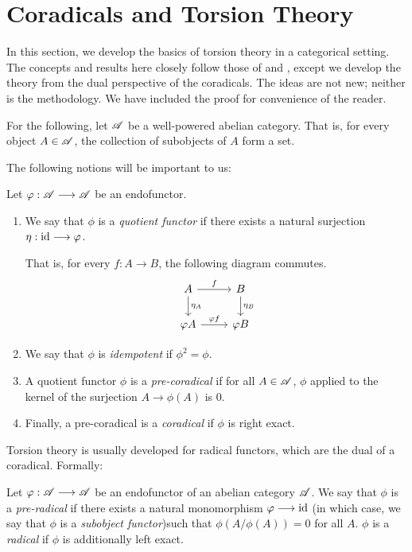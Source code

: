 \newpage
\section{Coradicals and Torsion Theory}\label{sect_torsion_theory}

In this section, we develop the basics of torsion theory in a 
categorical setting. The concepts and results here closely follow
those of \cite{BJV} and \cite{DTor}, except we develop the theory
from the dual perspective of the coradicals. The ideas are not new;
neither is the methodology. We have included the proof for 
convenience of the reader.

For the following, let $\mathscr{A}$ be a well-powered abelian category.
That is, for every object $A \in \mathscr{A}$, the collection of 
subobjects of $A$ form a set.

The following notions will be important to us:

\begin{defn}\label{def_coradical}
Let $\varphi: \mathscr{A} \longrightarrow \mathscr{A}$ be an endofunctor. 
\begin{enumerate}
\item We say that $\phi$ is a \emph{quotient functor} if there 
exists a natural surjection $\eta: \mathrm{id} \longrightarrow \varphi$. 

That is, for every $f: A \to B$, the following diagram commutes.
\[
\begin{tikzcd}
A \arrow{r}{f} \arrow{d}{\eta_A} &
B \arrow{d}{\eta_B} \\
\phi A \arrow{r}{\phi f} 
&\phi B
\end{tikzcd}
\]

\item We say that $\phi$ is \emph{idempotent} if $\phi^2 = \phi$.

\item A quotient functor $\phi$ is a \emph{pre-coradical} if for all
$A \in \mathscr{A}$, $\phi$ applied to the kernel of the surjection 
$A \to \phi(A)$ is $0$.

\item Finally, a pre-coradical is a \emph{coradical} if $\phi$ is
right exact.
\end{enumerate}
\end{defn}

Torsion theory is usually developed for radical functors, which 
are the dual of a coradical. Formally:

\begin{defn}\label{def_radical}
Let $\varphi: \mathscr{A} \longrightarrow \mathscr{A}$ be an endofunctor of an abelian 
category $\mathscr{A}$. We say that $\phi$ is a \emph{pre-radical} if 
there exists a natural monomorphism $\varphi \longrightarrow \mathrm{id}$ (in which case, we
say that $\phi$ is a \emph{subobject functor})such that 
$\phi(A/\phi(A)) = 0$ for all $A$. $\phi$ is a \emph{radical} if 
$\phi$ is additionally left exact.
\end{defn}

